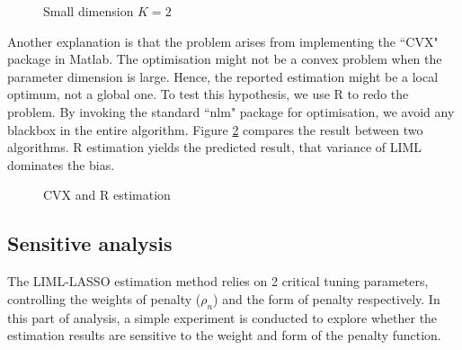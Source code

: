 \documentclass[12pt,pdftex,letterpaper]{article}
\begin{document}
\begin{figure}[h]
\centering
{}
\caption{Small dimension $K=2$}\label{k2}
\end{figure}

\indent Another explanation is that the problem arises from implementing the ``CVX" package in Matlab. The optimisation might not be a convex problem when the parameter dimension is large. Hence, the reported estimation might be a local optimum, not a global one. To test this hypothesis, we use R to redo the problem. By invoking the standard ``nlm" package for optimisation, we avoid any blackbox in the entire algorithm. Figure \ref{r} compares the result between two algorithms. R estimation yields the predicted result, that variance of LIML dominates the bias.

\begin{figure}[h]
\centering
{}
\caption{CVX and R estimation}\label{r}
\end{figure}

\subsection{Sensitive analysis}
\indent The LIML-LASSO estimation method relies on 2 critical tuning parameters, controlling the weights of penalty ($\rho_{n}$) and the form of penalty respectively. In this part of analysis, a simple experiment is conducted to explore whether the estimation results are sensitive to the weight and form of the penalty function. 
\end{document}
